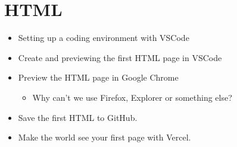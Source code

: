 \part{HTML}\label{part:html}

\begin{itemize}
    \item Setting up a coding environment with VSCode
    \item Create and previewing the first HTML page in VSCode
    \item Preview the HTML page in Google Chrome
    \begin{itemize}
        \item Why can't we use Firefox, Explorer or something else?
    \end{itemize}
    \item Save the first HTML to GitHub.
    \item Make the world see your first page with Vercel.
\end{itemize}


